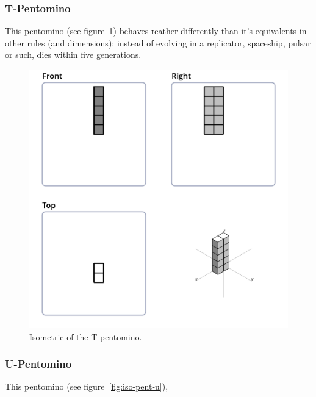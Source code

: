 \subsubsection{T-Pentomino}
\label{sec:t-pentomino}
This pentomino (see figure~\ref{fig:iso-pent-t}) behaves reather differently
than it's equivalents in other rules (and dimensions); instead of evolving in a
replicator, spaceship, pulsar or such, dies within five generations.

\begin{figure}
	\centering
	\includegraphics[scale=0.3]{iso_diagrams/o.png}
	\caption{Isometric of the T-pentomino.}
  \label{fig:iso-pent-t}
\end{figure}

\subsubsection{U-Pentomino}
\label{sec:u-pentomino}
This pentomino (see figure~\ref{fig:iso-pent-u}),


